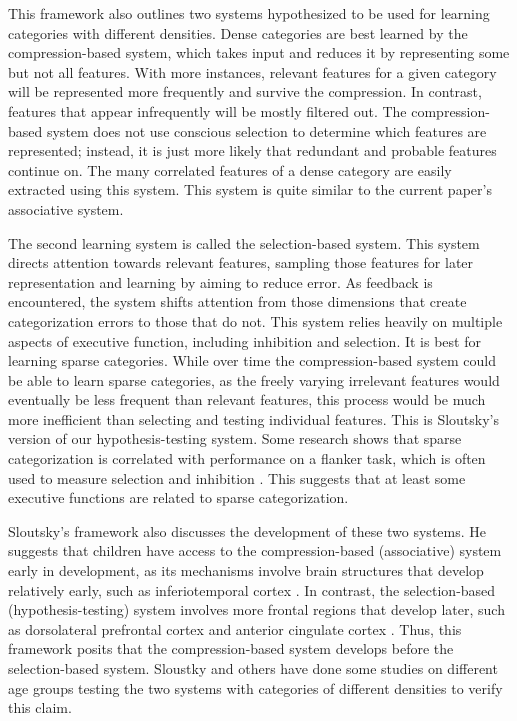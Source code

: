 \documentclass[../dissertation.tex]{subfiles}
\begin{document}
	This framework also outlines two systems hypothesized to be used for learning categories with different densities. Dense categories are best learned by the compression-based system, which takes input and reduces it by representing some but not all features. With more instances, relevant features for a given category will be represented more frequently and survive the compression. In contrast, features that appear infrequently will be mostly filtered out. The compression-based system does not use conscious selection to determine which features are represented; instead, it is just more likely that redundant and probable features continue on. The many correlated features of a dense category are easily extracted using this system. This system is quite similar to the current paper's associative system. \par 
	The second learning system is called the selection-based system. This system directs attention towards relevant features, sampling those features for later representation and learning by aiming to reduce error. As feedback is encountered, the system shifts attention from those dimensions that create categorization errors to those that do not. This system relies heavily on multiple aspects of executive function, including inhibition and selection. It is best for learning sparse categories. While over time the compression-based system could be able to learn sparse categories, as the freely varying irrelevant features would eventually be less frequent than relevant features, this process would be much more inefficient than selecting and testing individual features. This is Sloutsky's version of our hypothesis-testing system. Some research shows that sparse categorization is correlated with performance on a flanker task, which is often used to measure selection and inhibition \citep{Perry2016}. This suggests that at least some executive functions are related to sparse categorization. \par
	Sloutsky's framework also discusses the development of these two systems. He suggests that children have access to the compression-based (associative) system early in development, as its mechanisms involve brain structures that develop relatively early, such as inferiotemporal cortex \citep{Rodman1994}. In contrast, the selection-based (hypothesis-testing) system involves more frontal regions that develop later, such as dorsolateral prefrontal cortex and anterior cingulate cortex \citep{Eshel2007, Lewis1997, Segalowitz2004}. Thus, this framework posits that the compression-based system develops before the selection-based system. Sloustky and others have done some studies on different age groups testing the two systems with categories of different densities to verify this claim. \par 
\end{document}
